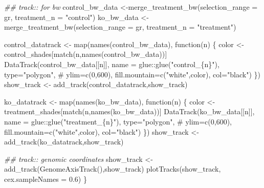 \documentclass[
  letterpaper,
  DIV=11,
  numbers=noendperiod]{scrartcl}
\newenvironment{Shaded}{\begin{snugshade}}{\end{snugshade}}
\newcommand{\AttributeTok}[1]{\textcolor[rgb]{0.40,0.45,0.13}{#1}}
\newcommand{\CommentTok}[1]{\textcolor[rgb]{0.37,0.37,0.37}{#1}}
\newcommand{\ControlFlowTok}[1]{\textcolor[rgb]{0.00,0.23,0.31}{#1}}
\newcommand{\DocumentationTok}[1]{\textcolor[rgb]{0.37,0.37,0.37}{\textit{#1}}}
\newcommand{\FloatTok}[1]{\textcolor[rgb]{0.68,0.00,0.00}{#1}}
\newcommand{\FunctionTok}[1]{\textcolor[rgb]{0.28,0.35,0.67}{#1}}
\newcommand{\NormalTok}[1]{\textcolor[rgb]{0.00,0.23,0.31}{#1}}
\newcommand{\OtherTok}[1]{\textcolor[rgb]{0.00,0.23,0.31}{#1}}
\newcommand{\SpecialCharTok}[1]{\textcolor[rgb]{0.37,0.37,0.37}{#1}}
\newcommand{\StringTok}[1]{\textcolor[rgb]{0.13,0.47,0.30}{#1}}
\begin{document}
\begin{Shaded}
\begin{Highlighting}[]
  \DocumentationTok{\#\# track:: for bw}
\NormalTok{  control\_bw\_data }\OtherTok{\textless{}{-}}\FunctionTok{merge\_treatment\_bw}\NormalTok{(}\AttributeTok{selection\_range =}\NormalTok{ gr,}
                                     \AttributeTok{treatment\_n =} \StringTok{"control"}\NormalTok{)}
\NormalTok{  ko\_bw\_data }\OtherTok{\textless{}{-}}\FunctionTok{merge\_treatment\_bw}\NormalTok{(}\AttributeTok{selection\_range =}\NormalTok{ gr,}
                                     \AttributeTok{treatment\_n =} \StringTok{"treatment"}\NormalTok{)}

\NormalTok{  control\_datatrack }\OtherTok{\textless{}{-}} \FunctionTok{map}\NormalTok{(}\FunctionTok{names}\NormalTok{(control\_bw\_data),}
    \ControlFlowTok{function}\NormalTok{(n) \{}
\NormalTok{      color }\OtherTok{\textless{}{-}}\NormalTok{ control\_shades[}\FunctionTok{match}\NormalTok{(n,}\FunctionTok{names}\NormalTok{(control\_bw\_data))]}
      \FunctionTok{DataTrack}\NormalTok{(control\_bw\_data[[n]],}
                \AttributeTok{name =}\NormalTok{ glue}\SpecialCharTok{::}\FunctionTok{glue}\NormalTok{(}\StringTok{"control\_\{n\}"}\NormalTok{),}
                \AttributeTok{type=}\StringTok{"polygon"}\NormalTok{,}
                \CommentTok{\# ylim=c(0,600),}
                \AttributeTok{fill.mountain=}\FunctionTok{c}\NormalTok{(}\StringTok{"white"}\NormalTok{,color),}
                \AttributeTok{col=}\StringTok{"black"}\NormalTok{)}
\NormalTok{    \})}
\NormalTok{  show\_track }\OtherTok{\textless{}{-}} \FunctionTok{add\_track}\NormalTok{(control\_datatrack,show\_track)}

\NormalTok{  ko\_datatrack }\OtherTok{\textless{}{-}} \FunctionTok{map}\NormalTok{(}\FunctionTok{names}\NormalTok{(ko\_bw\_data),}
    \ControlFlowTok{function}\NormalTok{(n) \{}
\NormalTok{      color }\OtherTok{\textless{}{-}}\NormalTok{ treatment\_shades[}\FunctionTok{match}\NormalTok{(n,}\FunctionTok{names}\NormalTok{(ko\_bw\_data))]}
      \FunctionTok{DataTrack}\NormalTok{(ko\_bw\_data[[n]],}
                \AttributeTok{name =}\NormalTok{ glue}\SpecialCharTok{::}\FunctionTok{glue}\NormalTok{(}\StringTok{"treatment\_\{n\}"}\NormalTok{),}
                \AttributeTok{type=}\StringTok{"polygon"}\NormalTok{,}
                \CommentTok{\# ylim=c(0,600),}
                \AttributeTok{fill.mountain=}\FunctionTok{c}\NormalTok{(}\StringTok{"white"}\NormalTok{,color),}
                \AttributeTok{col=}\StringTok{"black"}\NormalTok{)}
\NormalTok{    \})}
\NormalTok{  show\_track }\OtherTok{\textless{}{-}} \FunctionTok{add\_track}\NormalTok{(ko\_datatrack,show\_track)}
  
  \DocumentationTok{\#\# track:: genomic coordinates}
\NormalTok{  show\_track }\OtherTok{\textless{}{-}} \FunctionTok{add\_track}\NormalTok{(}\FunctionTok{GenomeAxisTrack}\NormalTok{(),show\_track)}
  \FunctionTok{plotTracks}\NormalTok{(show\_track, }\AttributeTok{cex.sampleNames =} \FloatTok{0.6}\NormalTok{)}
\NormalTok{\}}
\end{Highlighting}
\end{Shaded}
\end{document}
